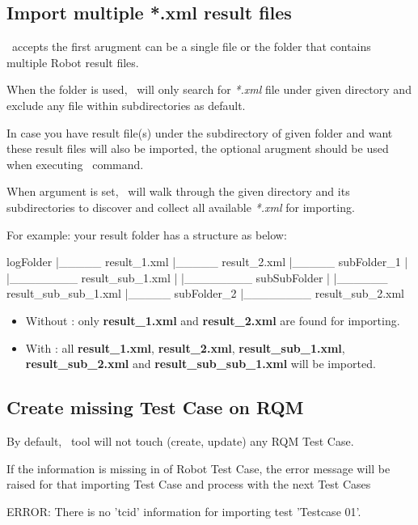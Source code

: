 \subsection{Import multiple *.xml result files}
\pkg\ accepts the first arugment  can be a single file or 
the folder that contains multiple Robot result files.

When the folder is used, \pkg\ will only search for \emph{*.xml} file under 
given directory and exclude any file within subdirectories as default.

In case you have result file(s) under the subdirectory of given folder and want 
these result files will also be imported, the optional arugment
 should be used when executing \pkg\ command.

When  argument is set, \pkg\ will walk through the given 
directory and its subdirectories to discover and collect all available 
\emph{*.xml} for importing.

For example: your result folder has a structure as below:

\begin{robotlog}
logFolder
   |_____ result_1.xml
   |_____ result_2.xml
   |_____ subFolder_1
   |         |________ result_sub_1.xml
   |         |________ subSubFolder
   |                       |______ result_sub_sub_1.xml
   |_____ subFolder_2
             |________ result_sub_2.xml
\end{robotlog}

\begin{itemize}
\item Without : only \textbf{result\_1.xml} and
      \textbf{result\_2.xml} are found for importing.
\item With : all \textbf{result\_1.xml}, 
      \textbf{result\_2.xml}, \textbf{result\_sub\_1.xml},
      \textbf{result\_sub\_2.xml} and \textbf{result\_sub\_sub\_1.xml} will
      be imported.
\end{itemize}

\subsection{Create missing Test Case on RQM}
By default, \pkg\ tool will not touch (create, update) any RQM Test Case.

If the  information is missing in \rcode{[Tags]} of Robot Test 
Case, the error message will be raised for that importing Test Case and process
with the next Test Cases
\begin{pythonlog}
ERROR: There is no 'tcid' information for importing test 'Testcase 01'.
\end{pythonlog}

